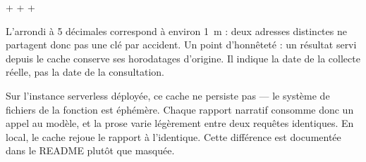 \begin{center}
 +  +
 + 
\end{center}

L'arrondi à 5 décimales correspond à environ 1~m : deux adresses distinctes ne
partagent donc pas une clé par accident. Un point d'honnêteté : un résultat
servi depuis le cache conserve ses horodatages d'origine. Il indique la date de
la collecte réelle, pas la date de la consultation.

\begin{honesty}
Sur l'instance serverless déployée, ce cache ne persiste pas — le système de
fichiers de la fonction est éphémère. Chaque rapport narratif consomme donc un
appel au modèle, et la prose varie légèrement entre deux requêtes identiques.
En local, le cache rejoue le rapport à l'identique. Cette différence est
documentée dans le README plutôt que masquée.
\end{honesty}
